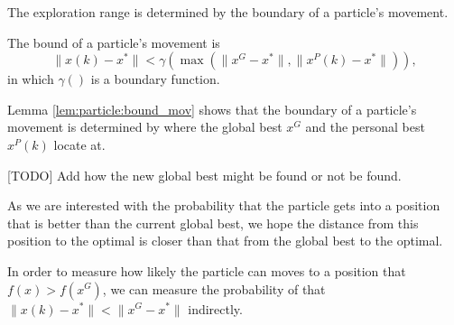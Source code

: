 The exploration range is determined by the boundary of a particle's movement.

\begin{mylem}
\label{lem:particle:bound_mov}
The bound of a particle's movement is 
\begin{equation}
\lVert x(k) - x^{*} \rVert < \gamma ( \max ( \lVert x^{G} - x^{*} \rVert , \lVert x^{P}(k) - x^{*}  \rVert ) ),
\end{equation}
in which $ \gamma () $ is a boundary function. 
\end{mylem}

Lemma \ref{lem:particle:bound_mov} shows that the boundary of a particle's movement is determined by where the global best $ x^{G} $ and the personal best $ x^{P}(k) $ locate at.

[TODO] Add how the new global best might be found or not be found.

As we are interested with the probability that the particle gets into a position that is better than the current global best, we hope the distance from this position to the optimal is closer than that from the global best to the optimal.

In order to measure how likely the particle can moves to a position that $ f(x) > f(x^{G}) $, we can measure the probability of that $ \lVert x(k) - x^{*} \rVert < \lVert x^{G} - x^{*} \rVert $ indirectly.

